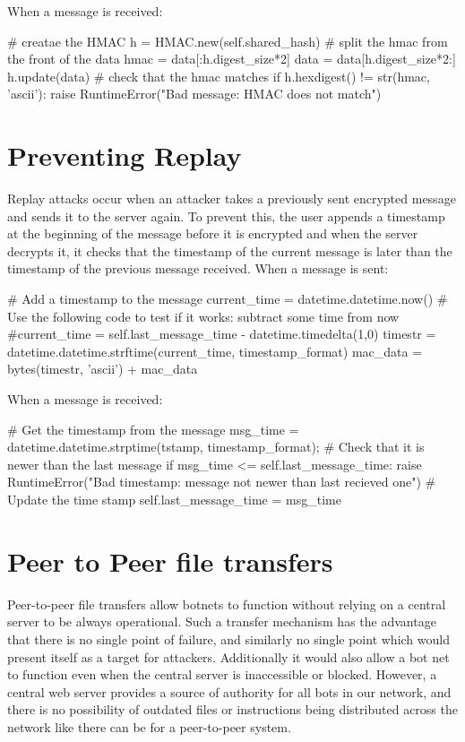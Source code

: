 \documentclass[9pt,a4paper]{article}
\begin{document}
When a message is received:
\begin{center}\begin{python}
# creatae the HMAC
h = HMAC.new(self.shared_hash)
# split the hmac from the front of the data
hmac = data[:h.digest_size*2]
data = data[h.digest_size*2:]
h.update(data)
# check that the hmac matches
if h.hexdigest() != str(hmac, 'ascii'):
    raise RuntimeError("Bad message: HMAC does not match")
\end{python}\end{center}

\section{Preventing Replay}
Replay attacks occur when an attacker takes a previously sent encrypted message and sends it to the server again. To prevent this, the user appends a timestamp at the beginning of the message before it is encrypted and when the server decrypts it, it checks that the timestamp of the current message is later than the timestamp of the previous message received.
When a message is sent:
\begin{center}\begin{python}
# Add a timestamp to the message
current_time = datetime.datetime.now()
# Use the following code to test if it works: subtract some time from now
#current_time = self.last_message_time - datetime.timedelta(1,0)
timestr = datetime.datetime.strftime(current_time, timestamp_format)
mac_data = bytes(timestr, 'ascii') + mac_data
\end{python}\end{center}

When a message is received:
\begin{center}\begin{python}
# Get the timestamp from the message
msg_time = datetime.datetime.strptime(tstamp, timestamp_format);
# Check that it is newer than the last message
if msg_time <= self.last_message_time:
    raise RuntimeError("Bad timestamp: message not newer than last recieved one")
# Update the time stamp
self.last_message_time = msg_time
\end{python}\end{center}

\section{Peer to Peer file transfers}
Peer-to-peer file transfers allow botnets to function without relying on a central server to be always operational. Such a transfer mechanism has the advantage that there is no single point of failure, and similarly no single point which would present itself as a target for attackers. Additionally it would also allow a bot net to function even when the central server is inaccessible or blocked. However, a central web server provides a source of authority for all bots in our network, and there is no possibility of outdated files or instructions being distributed across the network like there can be for a peer-to-peer system.
\end{document}
